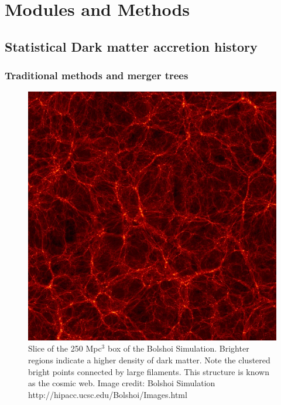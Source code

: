 \section{Modules and Methods}

\subsection{Statistical Dark matter accretion history}

\subsubsection{Traditional methods and merger trees}

\begin{figure}[h]
    \centering
    \includegraphics[width = \linewidth]{Figures/Chapter2/Bolshoi.jpg}
    \caption{Slice of the 250 Mpc$^3$ box of the Bolshoi Simulation. Brighter regions indicate a higher density of dark matter. Note the clustered bright points connected by large filaments. This structure is known as the cosmic web.
    Image credit: Bolshoi Simulation http://hipacc.ucsc.edu/Bolshoi/Images.html}
    \label{fig:Bolshoi}
\end{figure}

